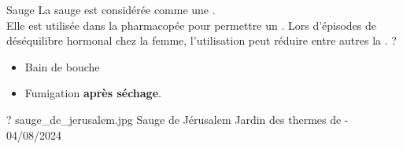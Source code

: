 \ficheidentiteplante
{Sauge}
{%
    La sauge est considérée comme une .\\ Elle est utilisée dans la pharmacopée pour permettre un .
}
{%
    Lors d'épisodes de déséquilibre hormonal chez la femme, l'utilisation peut réduire entre autres la . 
}
{%
    ?
}
{%
    \begin{itemize}[label = \bcplume]
        \item Bain de bouche
        \item Fumigation \textbf{après séchage}.
    \end{itemize}
}
{%
    ?
}
{%
    sauge_de_jerusalem.jpg
}
{%
    Sauge de Jérusalem
}
{%
    Jardin des thermes de  - 04/08/2024 
}
